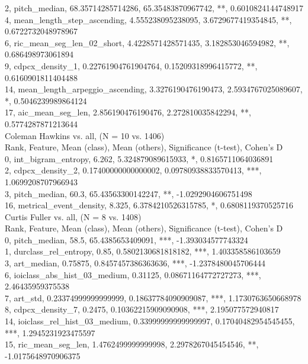 2, pitch_median, 68.35714285714286, 65.35483870967742, **, 0.6010824144748917\\
4, mean_length_step_ascending, 4.555238095238095, 3.6729677419354845, **, 0.6722732048978967\\
6, ric_mean_seg_len_02_short, 4.4228571428571435, 3.182853046594982, **, 0.686498973061894\\
9, cdpcx_density_1, 0.22761904761904764, 0.15209318996415772, **, 0.6160901811404488\\
14, mean_length_arpeggio_ascending, 3.3276190476190473, 2.5934767025089607, *, 0.5046239989864124\\
17, aic_mean_seg_len, 2.856190476190476, 2.272810035842294, **, 0.5774287871213644\\
Coleman Hawkins vs. all, (N = 10 vs. 1406)\\
Rank, Feature, Mean (class), Mean (others), Significance (t-test), Cohen's D\\
0, int_bigram_entropy, 6.262, 5.324879089615933, *, 0.8165711064036891\\
2, cdpcx_density_2, 0.17400000000000002, 0.09780938833570413, ***, 1.0699208707966943\\
3, pitch_median, 60.3, 65.43563300142247, **, -1.0292904606751498\\
16, metrical_event_density, 8.325, 6.3784210526315785, *, 0.6808119370525716\\
Curtis Fuller vs. all, (N = 8 vs. 1408)\\
Rank, Feature, Mean (class), Mean (others), Significance (t-test), Cohen's D\\
0, pitch_median, 58.5, 65.4385653409091, ***, -1.393034577743324\\
1, durclass_rel_entropy, 0.85, 0.5802130681818182, ***, 1.403358586103659\\
3, art_median, 0.75875, 0.8457457386363636, ***, -1.2378480045706444\\
6, ioiclass_abs_hist_03_medium, 0.31125, 0.08671164772727273, ***, 2.46435959375538\\
7, art_std, 0.23374999999999999, 0.18637784090909087, ***, 1.1730763650668978\\
8, cdpcx_density_7, 0.2475, 0.10362215909090908, ***, 2.195077572940817\\
14, ioiclass_rel_hist_03_medium, 0.33999999999999997, 0.17040482954545455, ***, 1.2945231923475597\\
15, ric_mean_seg_len, 1.4762499999999998, 2.2978267045454546, **, -1.0175648970906375\\
